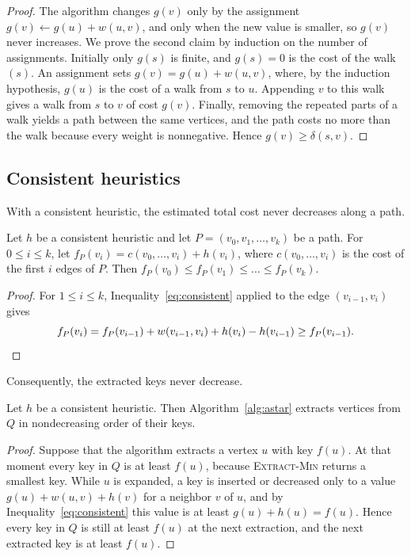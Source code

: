 \begin{proof}
The algorithm changes $g(v)$ only by the assignment $g(v) \gets g(u) + w(u,v)$,
and only when the new value is smaller, so $g(v)$ never increases. We prove the
second claim by induction on the number of assignments. Initially only $g(s)$ is
finite, and $g(s) = 0$ is the cost of the walk $(s)$. An assignment sets
$g(v) = g(u) + w(u,v)$, where, by the induction hypothesis, $g(u)$ is the cost
of a walk from $s$ to $u$. Appending $v$ to this walk gives a walk from $s$ to
$v$ of cost $g(v)$. Finally, removing the repeated parts of a walk yields a path
between the same vertices, and the path costs no more than the walk because
every weight is nonnegative. Hence $g(v) \ge \delta(s,v)$.
\end{proof}

\subsection{Consistent heuristics}\label{sec:consistent-proof}

With a consistent heuristic, the estimated total cost never decreases along a
path.

\begin{lemma}\label{lem:pathmono}
Let $h$ be a consistent heuristic and let $P = (v_0, v_1, \dots, v_k)$ be a
path. For $0 \le i \le k$, let $f_P(v_i) = c(v_0, \dots, v_i) + h(v_i)$, where
$c(v_0, \dots, v_i)$ is the cost of the first $i$ edges of $P$. Then
$f_P(v_0) \le f_P(v_1) \le \dots \le f_P(v_k)$.
\end{lemma}

\begin{proof}
For $1 \le i \le k$, Inequality~\eqref{eq:consistent} applied to the edge
$(v_{i-1}, v_i)$ gives
\begin{equation}\label{eq:fstep}
  f_P(v_i) = f_P(v_{i-1}) + w(v_{i-1}, v_i) + h(v_i) - h(v_{i-1})
           \ge f_P(v_{i-1}). \qedhere
\end{equation}
\end{proof}

Consequently, the extracted keys never decrease.

\begin{lemma}\label{lem:monotone}
Let $h$ be a consistent heuristic. Then Algorithm~\ref{alg:astar} extracts
vertices from $Q$ in nondecreasing order of their keys.
\end{lemma}

\begin{proof}
Suppose that the algorithm extracts a vertex $u$ with key $f(u)$. At that moment
every key in $Q$ is at least $f(u)$, because \textsc{Extract-Min} returns a
smallest key. While $u$ is expanded, a key is inserted or decreased only to a
value $g(u) + w(u,v) + h(v)$ for a neighbor $v$ of $u$, and by
Inequality~\eqref{eq:consistent} this value is at least $g(u) + h(u) = f(u)$.
Hence every key in $Q$ is still at least $f(u)$ at the next extraction, and the
next extracted key is at least $f(u)$.
\end{proof}

